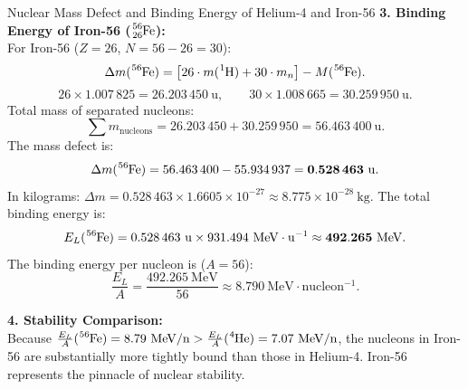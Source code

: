 \begin{workedexample}{Nuclear Mass Defect and Binding Energy of Helium-4 and Iron-56}
\textbf{3. Binding Energy of Iron-56 ($\ce{^{56}_{26}Fe}$):}\\
For Iron-56 ($Z = 26$, $N = 56 - 26 = 30$):
\[
\Delta m(\ce{^{56}Fe}) = \left[ 26 \cdot m(\ce{^1H}) + 30 \cdot m_n \right] - M(\ce{^{56}Fe}).
\]
\[
26 \times 1.007\,825 = 26.203\,450\ \mathrm{u}, \qquad 30 \times 1.008\,665 = 30.259\,950\ \mathrm{u}.
\]
Total mass of separated nucleons:
\[
\sum m_{\text{nucleons}} = 26.203\,450 + 30.259\,950 = 56.463\,400\ \mathrm{u}.
\]
The mass defect is:
\[
\Delta m(\ce{^{56}Fe}) = 56.463\,400 - 55.934\,937 = \mathbf{0.528\,463\ \mathrm{u}}.
\]
In kilograms: $\Delta m = 0.528\,463 \times 1.6605 \times 10^{-27} \approx 8.775 \times 10^{-28}\ \mathrm{kg}$.
The total binding energy is:
\[
E_L(\ce{^{56}Fe}) = 0.528\,463\ \mathrm{u} \times 931.494\ \mathrm{MeV\cdot u^{-1}} \approx \mathbf{492.265\ \mathrm{MeV}}.
\]
The binding energy per nucleon is ($A = 56$):
\[
\frac{E_L}{A} = \frac{492.265\ \mathrm{MeV}}{56} \approx \mathbf{8.790\ \mathrm{MeV\cdot nucleon^{-1}}}.
\]

\textbf{4. Stability Comparison:}\\
Because $\frac{E_L}{A}(\ce{^{56}Fe}) = 8.79\ \mathrm{MeV/n} > \frac{E_L}{A}(\ce{^4He}) = 7.07\ \mathrm{MeV/n}$, the nucleons in Iron-56 are substantially more tightly bound than those in Helium-4. Iron-56 represents the pinnacle of nuclear stability.
\end{workedexample}

